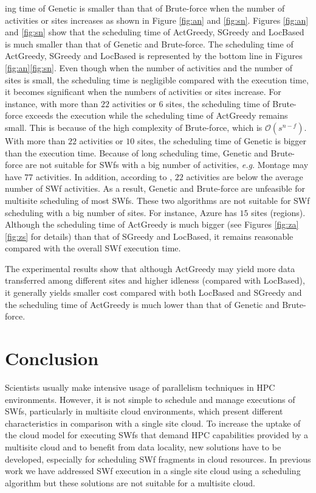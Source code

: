 \noindent ing time of Genetic is smaller than that of Brute-force when the number of activities or sites increases as shown in Figure \ref{fig:an} and \ref{fig:sn}. 
Figures \ref{fig:an} and \ref{fig:sn} show that the scheduling time of ActGreedy, SGreedy and LocBased is much smaller than that of Genetic and Brute-force. The scheduling time of ActGreedy, SGreedy and LocBased is represented by the bottom line in Figures \ref{fig:an}\ref{fig:sn}. Even though when the number of activities and the number of sites is small, the scheduling time is negligible compared with the execution time, it becomes significant when the numbers of activities or sites increase. For instance, with more than $22$ activities or $6$ sites, the scheduling time of Brute-force exceeds the execution while the scheduling time of ActGreedy remains small. This is because of the high complexity of Brute-force, which is $\mathcal{O}(s ^ { n - f })$. With more than $22$ activities or $10$ sites, the scheduling time of Genetic is bigger than the execution time. Because of long scheduling time, Genetic and Brute-force are not suitable for SWfs with a big number of activities, \textit{e.g.} Montage \cite{Montage} may have $77$ activities. In addition, according to \cite{Littauer2012}, $22$ activities are below the average number of SWf activities. As a result, Genetic and Brute-force are unfeasible for multisite scheduling of most SWfs. These two algorithms are not suitable for SWf scheduling with a big number of sites. For instance, Azure has $15$ sites (regions). Although the scheduling time of ActGreedy is much bigger (see Figures \ref{fig:za}\ref{fig:zs} for details) than that of SGreedy and LocBased, it remains reasonable compared with the overall SWf execution time. 

The experimental results show that although ActGreedy may yield more data transferred among different sites and higher idleness (compared with LocBased), it generally yields smaller cost compared with both LocBased and SGreedy and the scheduling time of ActGreedy is much lower than that of Genetic and Brute-force.

\section{Conclusion}
\label{sec:Con}

Scientists usually make intensive usage of parallelism techniques in HPC environments.  However, it is not simple to schedule and manage executions of SWfs, particularly in multisite cloud environments, which present different characteristics in comparison with a single site cloud. To increase the uptake  of the cloud model for executing SWfs that demand HPC capabilities provided by a multisite cloud and to benefit from data locality, new  solutions have to be developed,  especially for scheduling SWf fragments in cloud resources. In previous work \cite{Oliveira2012} we have addressed SWf execution in a single site cloud using a scheduling algorithm but these solutions are not suitable for a multisite cloud.

